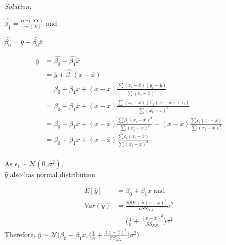 \documentclass[12pt,letterpaper, fleqn]{article}
\begin{document}
\begin{enumerate}
  \textit{Solution:}
  \begin{flushleft}
    $\hat{\beta_1} = \frac{cov(XY)}{var(X)}$ and

    $\hat{\beta_0} = \overline{y} - \hat{\beta_0}\overline{x}$

    \begin{equation}
      \begin{split}
        \hat{y} &= \hat{\beta_0} + \hat{\beta_1}\hat{x}\\
        &= \overline{y} + \hat{\beta_1}(x - \overline{x})\\
        &= \beta_0 + \beta_1\overline{x} + (x - \overline{x})\frac{\sum (x_i - \overline{x})(y_i - \overline{y})}{\sum (x_i - \overline{x})^2}\\
        &= \beta_0 + \beta_1\overline{x} + (x - \overline{x})\frac{\sum (x_i - \overline{x})(\beta_1(x_i - \overline{x}) + \epsilon_i)}{\sum (x_i - \overline{x})^2}\\
        &= \beta_0 + \beta_1\overline{x} + (x - \overline{x})\frac{\sum \beta_1(x_i - \overline{x})^2}{\sum (x_i - \overline{x})^2} + (x - \overline{x})\frac{\sum \epsilon_i(x_i - \overline{x})}{\sum (x_i - \overline{x})^2}\\
        &= \beta_0 + \beta_1x + (x - \overline{x})\frac{\sum \epsilon_i(x_i - \overline{x})}{\sum (x_i - \overline{x})^2}\\
      \end{split}
    \end{equation}

    As $\epsilon_i \sim \mathcal{N}(0, \sigma^2)$,\\
    $\hat{y}$ also has normal distribution

    \begin{equation*}
      \begin{split}
        E[\hat{y}] &= \beta_0 + \beta_1x \text{ and}\\
        Var(\hat{y}) &= \frac{SSE + n(x - \overline{x})^2}{n SS_{XX}}\sigma^2\\
        &= \biggl(\frac{1}{n} + \frac{(x - \overline{x})^2}{SS_{XX}}\biggr)\sigma^2
      \end{split}
    \end{equation*}
    Therefore, $\hat{y} \sim \mathcal{N}\biggl(\beta_0 + \beta_1x, \biggl(\frac{1}{n} + \frac{(x-\overline{x})^2}{SS_{XX}}\biggr)\sigma^2 \biggr)$
  \end{flushleft}
\end{enumerate}
\end{document}
